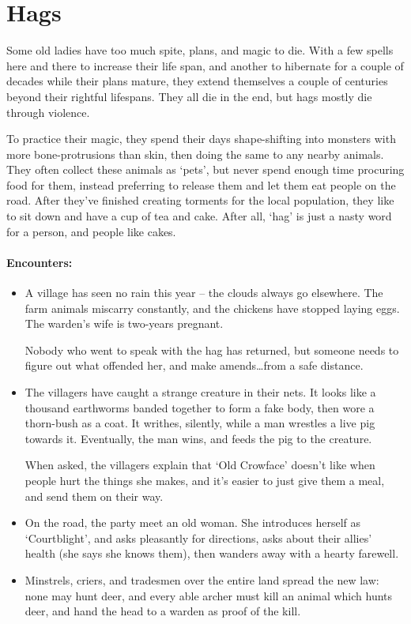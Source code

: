 \section[Hag]{Hags}
\label{hag}

\begin{multicols}{2}

\noindent
Some old ladies have too much spite, plans, and magic to die.
With a few spells here and there to increase their life span, and another to hibernate for a couple of decades while their plans mature, they extend themselves a couple of centuries beyond their rightful lifespans.
They all die in the end, but hags mostly die through violence.

To practice their magic, they spend their days shape-shifting into monsters with more bone-protrusions than skin, then doing the same to any nearby animals.
They often collect these animals as `pets', but never spend enough time procuring food for them, instead preferring to release them and let them eat people on the road.
After they've finished creating torments for the local population, they like to sit down and have a cup of tea and cake.
After all, `hag' is just a nasty word for a person, and people like cakes.

\hag

\showStdSpells

\paragraph{Encounters:}

\begin{itemize}
  \item
  A village has seen no rain this year -- the clouds always go elsewhere.
  The farm animals miscarry constantly, and the chickens have stopped laying eggs.
  The warden's wife is two-years pregnant.

  Nobody who went to speak with the hag has returned, but someone needs to figure out what offended her, and make amends\ldots from a safe distance.
  \item
  The villagers have caught a strange creature in their nets.
  It looks like a thousand earthworms banded together to form a fake body, then wore a thorn-bush as a coat.
  It writhes, silently, while a man wrestles a live pig towards it.
  Eventually, the man wins, and feeds the pig to the creature.

  When asked, the villagers explain that `Old Crowface' doesn't like when people hurt the things she makes, and it's easier to just give them a meal, and send them on their way.
  \item
  On the road, the party meet an old woman.
  She introduces herself as `Courtblight', and asks pleasantly for directions, asks about their allies' health (she says she knows them), then wanders away with a hearty farewell.
  \item
  Minstrels, criers, and tradesmen over the entire land spread the new law: none may hunt deer, and every able archer must kill an animal which hunts deer, and hand the head to a warden as proof of the kill.


\end{itemize}
\end{multicols}
